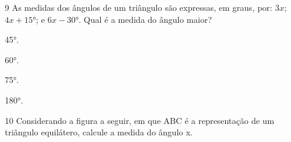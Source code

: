 











\num{9} As medidas dos ângulos de um triângulo são expressas, em graus, por:
$3x$; $4x + 15°$; e $6x - 30°$. Qual é a medida do ângulo maior?

\begin{escolha}
\item 45°.
\item 60°.
\item 75°.
\item 180°.
\end{escolha}

\pagebreak

\num{10} Considerando a figura a seguir, em que ABC é a representação de um
triângulo equilátero, calcule a medida do ângulo x.

